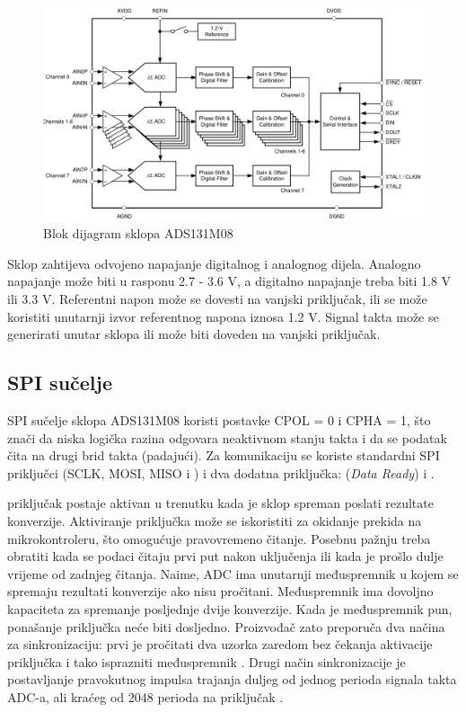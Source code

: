             \begin{figure}[htb]
                \centering
                \includegraphics[width=\textwidth]{slike/ads131m08_blok_dijagram.png}
                \caption{Blok dijagram sklopa ADS131M08 \cite{ads131m08_datasheet}}
                \label{fig:ads131m08_blok_dijagram}
            \end{figure}

            Sklop zahtijeva odvojeno napajanje digitalnog i analognog dijela. Analogno napajanje može biti u rasponu 2.7 - 3.6 V, a digitalno napajanje treba biti 1.8 V ili 3.3 V. Referentni napon može se dovesti na vanjski priključak, ili se može koristiti unutarnji izvor referentnog napona iznosa 1.2 V. Signal takta može se generirati unutar sklopa ili može biti doveden na vanjski priključak. 

        \subsection{SPI sučelje}
            SPI sučelje sklopa ADS131M08 koristi postavke CPOL = 0 i CPHA = 1, što znači da niska logička razina odgovara neaktivnom stanju takta i da se podatak čita na drugi brid takta (padajući). Za komunikaciju se koriste standardni SPI priključci (SCLK, MOSI, MISO i ) i dva dodatna priključka:  (\textit{Data Ready}) i .
            
             priključak postaje aktivan u trenutku kada je sklop spreman poslati rezultate konverzije. Aktiviranje priključka može se iskoristiti za okidanje prekida na mikrokontroleru, što omogućuje pravovremeno čitanje. Posebnu pažnju treba obratiti kada se podaci čitaju prvi put nakon uključenja ili kada je prošlo dulje vrijeme od zadnjeg čitanja. Naime, ADC ima unutarnji međuspremnik u kojem se spremaju rezultati konverzije ako nisu pročitani. Međuspremnik ima dovoljno kapaciteta za spremanje posljednje dvije konverzije. Kada je međuspremnik pun, ponašanje priključka  neće biti dosljedno. Proizvođač zato preporuča dva načina za sinkronizaciju: prvi je pročitati dva uzorka zaredom bez čekanja aktivacije  priključka i tako isprazniti međuspremnik \cite{ads131m08_datasheet}. Drugi način sinkronizacije je postavljanje pravokutnog impulsa trajanja duljeg od jednog perioda signala takta ADC-a, ali kraćeg od 2048 perioda na priključak  \cite{ads131m08_datasheet}.

